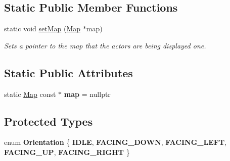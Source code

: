 \subsection*{Static Public Member Functions}
\begin{DoxyCompactItemize}
\item 
static void \mbox{\hyperlink{classRose_1_1Character_1_1Actor_a86d4d7577bddeb7914067d937e770991}{set\+Map}} (\mbox{\hyperlink{classMap}{Map}} $\ast$map)
\begin{DoxyCompactList}\small\item\em Sets a pointer to the map that the actors are being displayed one. \end{DoxyCompactList}\end{DoxyCompactItemize}
\subsection*{Static Public Attributes}
\begin{DoxyCompactItemize}
\item 
\mbox{\label{classRose_1_1Character_1_1Actor_aad957819d906297b425c9eddcbeed8aa}} 
static \mbox{\hyperlink{classMap}{Map}} const  $\ast$ {\bfseries map} = nullptr
\end{DoxyCompactItemize}
\subsection*{Protected Types}
\begin{DoxyCompactItemize}
\item 
\mbox{\label{classRose_1_1Character_1_1Actor_ab0d422b812b0eeb68175ab8d77e4f4a9}} 
enum {\bfseries Orientation} \{ \newline
{\bfseries I\+D\+LE}, 
{\bfseries F\+A\+C\+I\+N\+G\+\_\+\+D\+O\+WN}, 
{\bfseries F\+A\+C\+I\+N\+G\+\_\+\+L\+E\+FT}, 
{\bfseries F\+A\+C\+I\+N\+G\+\_\+\+UP}, 
\newline
{\bfseries F\+A\+C\+I\+N\+G\+\_\+\+R\+I\+G\+HT}
 \}
\end{DoxyCompactItemize}
